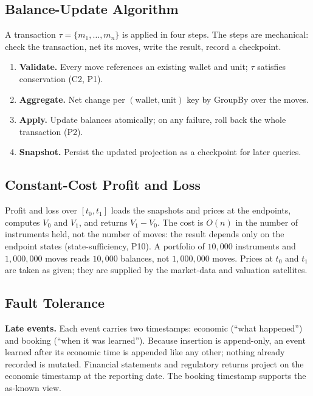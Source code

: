 \subsection{Balance-Update Algorithm}
\label{sec:implementation-update}

A transaction $\tau=\{m_1,\dots,m_n\}$ is applied in four steps. The steps are mechanical: check the transaction, net its moves, write the result, record a checkpoint.

\begin{enumerate}[nosep]
\item \textbf{Validate.} Every move references an existing wallet and unit; $\tau$ satisfies conservation (C2, P1).
\item \textbf{Aggregate.} Net change per $(\text{wallet},\text{unit})$ key by GroupBy over the moves.
\item \textbf{Apply.} Update balances atomically; on any failure, roll back the whole transaction (P2).
\item \textbf{Snapshot.} Persist the updated projection as a checkpoint for later queries.
\end{enumerate}

\subsection{Constant-Cost Profit and Loss}
\label{sec:implementation-pnl}

Profit and loss over $[t_0,t_1]$ loads the snapshots and prices at the endpoints, computes $V_0$ and $V_1$, and returns $V_1-V_0$. The cost is $O(n)$ in the number of instruments held, not the number of moves: the result depends only on the endpoint states (state-sufficiency, P10). A portfolio of $10{,}000$ instruments and $1{,}000{,}000$ moves reads $10{,}000$ balances, not $1{,}000{,}000$ moves. Prices at $t_0$ and $t_1$ are taken as given; they are supplied by the market-data and valuation satellites.

\subsection{Fault Tolerance}
\label{sec:implementation-faults}

\noindent\textbf{Late events.} Each event carries two timestamps: economic (``what happened'') and booking (``when it was learned''). Because insertion is append-only, an event learned after its economic time is appended like any other; nothing already recorded is mutated. Financial statements and regulatory returns project on the economic timestamp at the reporting date. The booking timestamp supports the as-known view.


